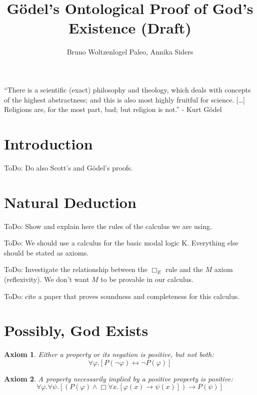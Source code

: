\documentclass{article}
\author{Bruno Woltzenlogel Paleo, Annika Siders}
\title{G\"{o}del's Ontological Proof of God's Existence (Draft)}
\newtheorem{axiom}{Axiom}
\newcommand{\imp}{\rightarrow}
\newcommand{\biimp}{\leftrightarrow}
\newcommand{\all}{\forall}
\newcommand{\nec}{\Box} %
\begin{document}
\maketitle

\newcommand{\ess}[2]{#1 \ \mathit{ess} \ #2}
\newcommand{\NE}{E}


\noindent
``There is a scientific (exact) philosophy and theology,
which deals with concepts of the highest abstractness; and this is also most highly fruitful for science. [\ldots] Religions are, for the most part, bad; but religion is not.'' - Kurt G\"{o}del

\section{Introduction}

ToDo: Do also Scott's and Gödel's proofs.


\section{Natural Deduction}

ToDo: Show and explain here the rules of the calculus we are using.

ToDo: We should use a calculus for the basic modal logic K. Everything else should be stated as axioms.

ToDo: Investigate the relationship between the $\nec_E$ rule and the $M$ axiom (reflexivity). We don't want $M$ to be provable in our calculus. 

ToDo: cite a paper that proves soundness and completeness for this calculus.

\section{Possibly, God Exists}

\begin{axiom}
\label{A1}
Either a property or its negation is positive, but not both:
$$
\all \varphi. [P(\neg \varphi) \biimp \neg P(\varphi)]
$$
\end{axiom}

\begin{axiom}
\label{A2}
A property necessarily implied by a positive property is positive:
$$
\all \varphi. \all \psi.[(P(\varphi) \wedge \nec \all x.[\varphi(x) \imp \psi(x)]) \imp P(\psi)]
$$
\end{axiom}
\end{document}
